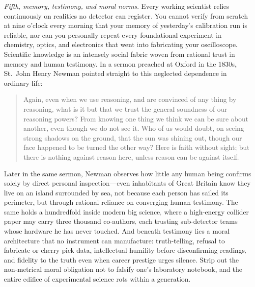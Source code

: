 \emph{Fifth, memory, testimony, and moral norms.} Every working scientist relies continuously on realities no detector can register. You cannot verify from scratch at nine o'clock every morning that your memory of yesterday's calibration run is reliable, nor can you personally repeat every foundational experiment in chemistry, optics, and electronics that went into fabricating your oscilloscope. Scientific knowledge is an intensely social fabric woven from rational trust in memory and human testimony. In a sermon preached at Oxford in the 1830s, St.\ John Henry Newman pointed straight to this neglected dependence in ordinary life:

\begin{quote}
Again, even when we use reasoning, and are convinced of any thing by reasoning, what is it but that we trust the general soundness of our reasoning powers? From knowing one thing we think we can be sure about another, even though we do not see it. Who of us would doubt, on seeing strong shadows on the ground, that the sun was shining out, though our face happened to be turned the other way? Here is faith without sight; but there is nothing against reason here, unless reason can be against itself.
\end{quote}

Later in the same sermon, Newman observes how little any human being confirms solely by direct personal inspection---even inhabitants of Great Britain know they live on an island surrounded by sea, not because each person has sailed its perimeter, but through rational reliance on converging human testimony. The same holds a hundredfold inside modern big science, where a high-energy collider paper may carry three thousand co-authors, each trusting sub-detector teams whose hardware he has never touched. And beneath testimony lies a moral architecture that no instrument can manufacture: truth-telling, refusal to fabricate or cherry-pick data, intellectual humility before disconfirming readings, and fidelity to the truth even when career prestige urges silence. Strip out the non-metrical moral obligation not to falsify one's laboratory notebook, and the entire edifice of experimental science rots within a generation.

